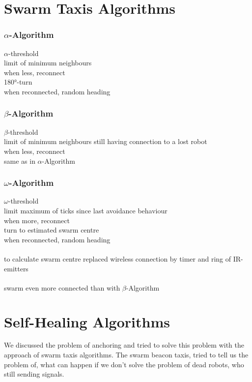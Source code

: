 \documentclass[
	a4paper,
	article,
	pagesize,
	pdftex,
	12pt,
	english,
	fleqn,
	final,
	]{scrartcl}
\begin{document}
\color{red}
\section{Swarm Taxis Algorithms}

\subsubsection{$\alpha$-Algorithm}
$\alpha$-threshold\\
limit of minimum neighbours\\
when less, reconnect\\
180°-turn\\
when reconnected, random heading

\subsubsection{$\beta$-Algorithm}
$\beta$-threshold\\
limit of minimum neighbours still having connection to a lost robot\\
when less, reconnect\\
same as in $\alpha$-Algorithm

\subsubsection{$\omega$-Algorithm}
$\omega$-threshold\\
limit maximum of ticks since last avoidance behaviour\\
when more, reconnect\\
turn to estimated swarm centre\\
when reconnected, random heading\\
\ \\
to calculate swarm centre replaced wireless connection by timer and ring of IR-emitters\\
\ \\
swarm even more connected than with $\beta$-Algorithm
\color{black}

\section{Self-Healing Algorithms}
We discussed the problem of anchoring and tried to solve this problem with the approach of swarm taxis algorithms. The swarm beacon taxis, tried to tell us the problem of, what can happen if we don't solve the problem of dead robots, who still sending signals.
\end{document}
